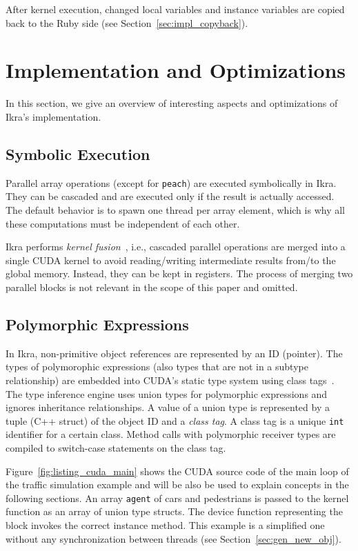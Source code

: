 \documentclass[preprint]{sigplanconf}
\begin{document}
After kernel execution, changed local variables and instance variables are copied back to the Ruby side (see Section~\ref{sec:impl_copyback}).


\section{Implementation and Optimizations}
In this section, we give an overview of interesting aspects and optimizations of Ikra's implementation.

\subsection{Symbolic Execution}
Parallel array operations (except for \texttt{peach}) are executed symbolically in Ikra. They can be cascaded and are executed only if the result is actually accessed. The default behavior is to spawn one thread per array element, which is why all these computations must be independent of each other. 

Ikra performs \emph{kernel fusion}~\cite{Wu:2012:KWA:2457472.2457490, Wahib:2014:SKF:2683593.2683615}, i.e., cascaded parallel operations are merged into a single CUDA kernel to avoid reading/writing intermediate results from/to the global memory. Instead, they can be kept in registers. The process of merging two parallel blocks is not relevant in the scope of this paper and omitted.

\subsection{Polymorphic Expressions}
\label{sec:polymorphic}
In Ikra, non-primitive object references are represented by an ID (pointer). The types of polymorophic expressions (also types that are not in a subtype relationship) are embedded into CUDA's static type system using class tags~\cite{Abadi:1989:DTS:75277.75296}. The type inference engine uses union types for polymorphic expressions and ignores inheritance relationships. A value of a union type is represented by a tuple (C++ struct) of the object ID and a \emph{class tag}. A class tag is a unique \texttt{int} identifier for a certain class. Method calls with polymorphic receiver types are compiled to switch-case statements on the class tag.

Figure~\ref{fig:listing_cuda_main} shows the CUDA source code of the main loop of the traffic simulation example and will be also be used to explain concepts in the following sections. An array \texttt{agent} of cars and pedestrians is passed to the kernel function as an array of union type structs. The device function representing the block invokes the correct instance method. This example is a simplified one without any synchronization between threads (see Section~\ref{sec:gen_new_obj}).
\end{document}
